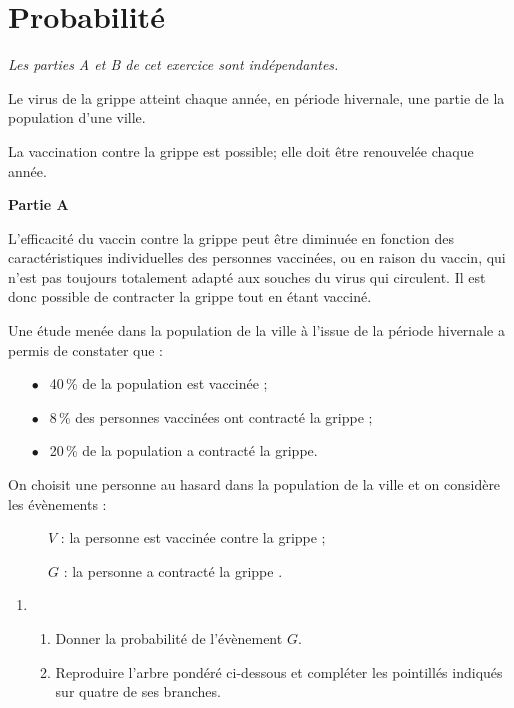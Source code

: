 \documentclass{cornouaille}
\begin{document}
\section{Probabilité}
\begin{exercice}


\bigskip

\emph{Les parties A et B de cet exercice sont indépendantes.}

\medskip

Le virus de la grippe atteint chaque année, en période hivernale, une partie de la population d'une ville.

La vaccination contre la grippe est possible; elle doit être renouvelée chaque année.

\bigskip

\textbf{Partie A}

\medskip

L'efficacité du vaccin contre la grippe peut être diminuée en fonction des caractéristiques
individuelles des personnes vaccinées, ou en raison du vaccin, qui n'est pas toujours
totalement adapté aux souches du virus qui circulent. Il est donc possible de contracter la
grippe tout en étant vacciné.

Une étude menée dans la population de la ville à l'issue de la période hivernale a permis de constater que :

\begin{itemize}
\item[$\bullet~~$]40\,\% de la population est vaccinée ;
\item[$\bullet~~$]8\,\% des personnes vaccinées ont contracté la grippe ;
\item[$\bullet~~$]20\,\% de la population a contracté la grippe.
\end{itemize}

\smallskip

On choisit une personne au hasard dans la population de la ville et on considère les
évènements :

\begin{description}
\item[ ] $V$ : \og la personne est vaccinée contre la grippe \fg{} ;
\item[ ] $G$ : \og la personne a contracté la grippe \fg.
\end{description}

\medskip

\begin{enumerate}
\item 
	\begin{enumerate}
		\item Donner la probabilité de l'évènement $G$.
		\item Reproduire l'arbre pondéré ci-dessous et compléter les pointillés indiqués sur quatre de ses branches.
		

\end{enumerate}
\end{enumerate}
\end{exercice}
\end{document}
